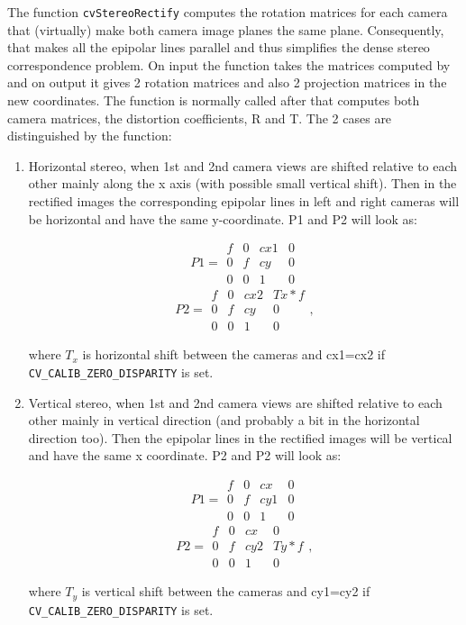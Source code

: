 The function \texttt{cvStereoRectify} computes the rotation matrices for each camera that (virtually) make both camera image planes the same plane. Consequently, that makes all the epipolar lines parallel and thus simplifies the dense stereo correspondence problem. On input the function takes the matrices computed by  and on output it gives 2 rotation matrices and also 2 projection matrices in the new coordinates. The function is normally called after  that computes both camera matrices, the distortion coefficients, R and T. The 2 cases are distinguished by the function: 

\begin{enumerate}
\item{Horizontal stereo, when 1st and 2nd camera views are shifted relative to each other mainly along the x axis (with possible small vertical shift). Then in the rectified images the corresponding epipolar lines in left and right cameras will be horizontal and have the same y-coordinate. P1 and P2 will look as: 

\[
P1=
\begin{array}{cccc}
f & 0 & cx1 & 0\\
0 & f & cy & 0\\
0 & 0 & 1 & 0
\end{array}
\]
\[
P2=
\begin{array}{cccc}
f & 0 & cx2 & Tx*f\\
0 & f & cy & 0\\
0 & 0 & 1 & 0
\end{array}
,
\]

where $T_x$ is horizontal shift between the cameras and cx1=cx2 if \texttt{CV\_CALIB\_ZERO\_DISPARITY} is set.}
\item{Vertical stereo, when 1st and 2nd camera views are shifted relative to each other mainly in vertical direction (and probably a bit in the horizontal direction too). Then the epipolar lines in the rectified images will be vertical and have the same x coordinate. P2 and P2 will look as:

\[
P1=
\begin{array}{cccc}
f & 0 & cx & 0\\
0 & f & cy1 & 0\\
0 & 0 & 1 & 0
\end{array}
\]
\[
P2=
\begin{array}{cccc}
f & 0 & cx & 0\\
0 & f & cy2 & Ty*f\\
0 & 0 & 1 & 0
\end{array}
,
\]

where $T_y$ is vertical shift between the cameras and cy1=cy2 if \texttt{CV\_CALIB\_ZERO\_DISPARITY} is set.}
\end{enumerate} 

